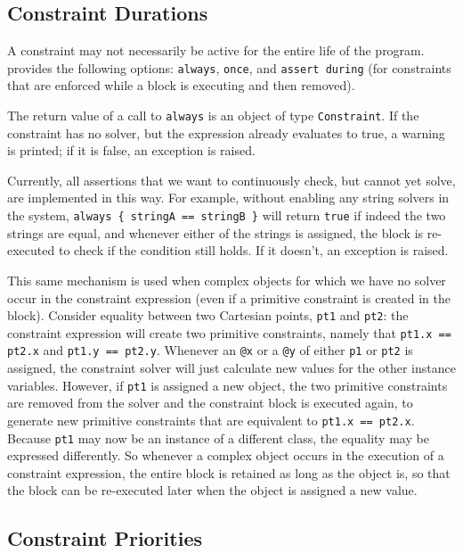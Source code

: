 \subsection{Constraint Durations}
\label{sec:constraint-durations}

A constraint may not necessarily be active for the entire life of the
program.  \langname provides the following options:
\lstinline{always}, \lstinline{once}, and
\lstinline{assert during} (for constraints that are enforced
while a block is executing and then removed).


The return value of a call to \lstinline{always} is an object of type
\lstinline{Constraint}. If the constraint has no solver, but the
expression already evaluates to true, a warning is printed; if it is
false, an exception is raised.

Currently, all assertions that we want to continuously check,
but cannot yet solve, are implemented in this way. For example, without
enabling any string solvers in the system, 
\lstinline!always { stringA == stringB }! will return \lstinline{true} 
if indeed the two strings
are equal, and whenever either of the strings is assigned, the block is
re-executed to check if the condition still holds. If it doesn't,
an exception is raised.

This same mechanism is used when complex objects for which we have no
solver occur in the constraint expression (even if a primitive
constraint is created in the block). Consider equality between two
Cartesian points, \lstinline{pt1} and \lstinline{pt2}: the constraint
expression will create two primitive constraints, namely that
\lstinline{pt1.x == pt2.x} and \lstinline{pt1.y == pt2.y}. Whenever an
\lstinline{@x} or a \lstinline{@y} of either \lstinline{p1} or
\lstinline{pt2} is assigned, the constraint solver will just calculate
new values for the other instance variables. However, if
\lstinline{pt1} is assigned a new object, the two primitive
constraints are removed from the solver and the constraint block is
executed again, to generate new primitive constraints that 
are equivalent to \lstinline{pt1.x == pt2.x}.
Because \lstinline{pt1} may now be an instance of
a different class, the equality may
be expressed differently. So whenever a complex object occurs in the
execution of a constraint expression, the entire block is retained
as long as the object is, so that the block can be re-executed later
when the object is assigned a new value.

\subsection{Constraint Priorities}

